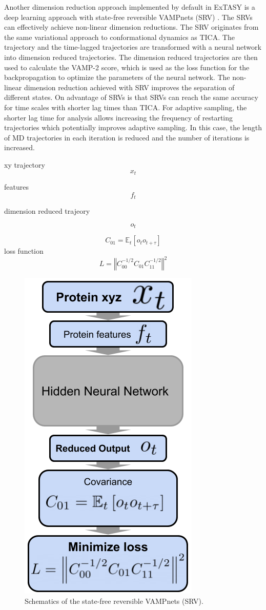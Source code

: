 Another dimension reduction approach implemented by default in ExTASY is a deep learning approach with state-free reversible VAMPnets (SRV) \cite{Mardt2018,chen2019jcp}. The SRVs can effectively achieve non-linear dimension reductions. The SRV originates from the same variational
approach to conformational dynamics as TICA. The trajectory and the time-lagged trajectories are transformed with a neural network into dimension reduced trajectories. The dimension reduced trajectories are then used to calculate the VAMP-2 score, which is used as the loss function for the backpropagation to optimize the parameters of the neural network. The non-linear dimension reduction achieved with SRV improves the separation of different states. On advantage of SRVs is that SRVs can reach the same accuracy for time scales with shorter lag times than TICA. For adaptive sampling, the shorter lag time for analysis allows increasing the frequency of restarting trajectories which potentially improves adaptive sampling. In this case, the length of MD trajectories in each iteration is reduced and the number of iterations is increased.

xy trajectory
$$x_{t}$$

features
$$f_{t}$$

dimension reduced trajeory

$$o_{t}$$

$$C_{01}=\ensuremath{\mathbb{E}}_{t}\left[o_{t}o_{t+\tau}\right]$$
loss function
$$L=\left\Vert C_{00}^{-1/2}C_{01}C_{11}^{-1/2}\right\Vert ^{2}$$

\begin{figure}[H]
  \centering
  \includegraphics[width=0.4\linewidth]{figures3/NN.png}
  \caption{Schematics of the state-free reversible VAMPnets (SRV).}
  \label{fig:NN}
\end{figure}


